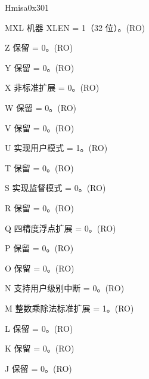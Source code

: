 \begin{register}{H}{misa}{0x301}\label{regdesc:MISA}
%
%
%
%
%
%
%
%
%
%
%
%
%
%
%
%
%
%
%
%
%
%
%
%
%
%
%
%
\regnewline%
\begin{regdesc}\begin{reglist}
\label{fielddesc:MISAMXL}\item [MXL] 机器 XLEN = 1（32 位）。(RO)
\label{fielddesc:MISAZ}\item [Z] 保留 = 0。(RO)
\label{fielddesc:MISAY}\item [Y] 保留 = 0。(RO)
\label{fielddesc:MISAX}\item [X] 非标准扩展 = 0。(RO)
\label{fielddesc:MISAW}\item [W] 保留 = 0。(RO)
\label{fielddesc:MISAV}\item [V] 保留 = 0。(RO)
\label{fielddesc:MISAU}\item [U] 实现用户模式 = 1。(RO)
\label{fielddesc:MISAT}\item [T] 保留 = 0。(RO)
\label{fielddesc:MISAS}\item [S] 实现监督模式 = 0。(RO)
\label{fielddesc:MISAR}\item [R] 保留 = 0。(RO)
\label{fielddesc:MISAQ}\item [Q] 四精度浮点扩展 = 0。(RO)
\label{fielddesc:MISAP}\item [P] 保留 = 0。(RO)
\label{fielddesc:MISAO}\item [O] 保留 = 0。(RO)
\label{fielddesc:MISAN}\item [N] 支持用户级别中断 = 0。(RO)
\label{fielddesc:MISAM}\item [M] 整数乘除法标准扩展 = 1。(RO)
\label{fielddesc:MISAL}\item [L] 保留 = 0。(RO)
\label{fielddesc:MISAK}\item [K] 保留 = 0。(RO)
\label{fielddesc:MISAJ}\item [J] 保留 = 0。(RO)

\end{reglist}
\end{regdesc}
\end{register}
